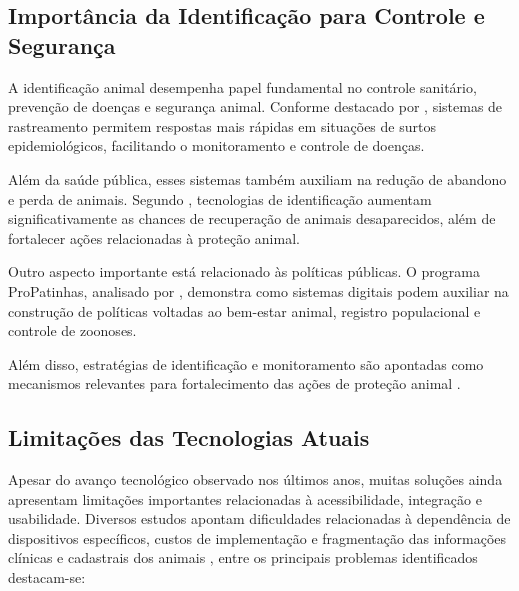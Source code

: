 \documentclass{UNESC}
\begin{document}
\subsection{Importância da Identificação para Controle e Segurança}

A identificação animal desempenha papel fundamental no controle sanitário, prevenção de doenças e segurança animal. Conforme destacado por , sistemas de rastreamento permitem respostas mais rápidas em situações de surtos epidemiológicos, facilitando o monitoramento e controle de doenças.

Além da saúde pública, esses sistemas também auxiliam na redução de abandono e perda de animais. Segundo , tecnologias de identificação aumentam significativamente as chances de recuperação de animais desaparecidos, além de fortalecer ações relacionadas à proteção animal.

Outro aspecto importante está relacionado às políticas públicas. O programa ProPatinhas, analisado por , demonstra como sistemas digitais podem auxiliar na construção de políticas voltadas ao bem-estar animal, registro populacional e controle de zoonoses. 

Além disso, estratégias de identificação e monitoramento são apontadas como mecanismos relevantes para fortalecimento das ações de proteção animal \cite{begnini2025,MOUTINHO2017}.

\subsection{Limitações das Tecnologias Atuais}

Apesar do avanço tecnológico observado nos últimos anos, muitas soluções ainda apresentam limitações importantes relacionadas à acessibilidade, integração e usabilidade. Diversos estudos apontam dificuldades relacionadas à dependência de dispositivos específicos, custos de implementação e fragmentação das informações clínicas e cadastrais dos animais \cite{zhao2020,sartori2018,MORAES2024}, entre os principais problemas identificados destacam-se:
\end{document}
